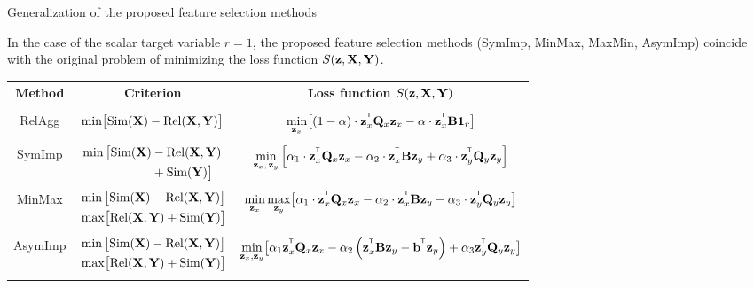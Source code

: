 \documentclass[10pt]{beamer}
\begin{document}
\begin{frame}{Generalization of the proposed feature selection methods}
	\begin{theorem}[Isachenko, 2018]
		In the case of the scalar target variable $r=1$, the proposed feature selection methods (SymImp, MinMax, MaxMin, AsymImp) coincide with the original problem of minimizing the loss function $S(\bz, \bX, \bY)$.
	\end{theorem}
	\begin{table}
		\centering
		\footnotesize{
			\begin{tabular}{c|c|c}
				\hline
				Method & Criterion & Loss function $S(\bz, \bX, \bY)$ \\
				\hline && \\ 
				RelAgg & $\min \bigl[ \text{Sim}(\bX) - \text{Rel}(\bX, \bY) \bigr] $ & $\min\limits_{\bz_x} \bigl[ (1 - \alpha) \cdot \bz_x^{\T} \bQ_x \bz_x - \alpha \cdot \bz_x^{\T} \bB \bOne_r \bigr] $ \\ &&\\
				SymImp & $\begin{aligned} \min \, \bigl[ \text{Sim}(\bX) & - \text{Rel}(\bX, \bY) \\ & + \text{Sim}(\bY) \bigr] \end{aligned}$ & $ \min\limits_{\bz_x, \, \bz_y} \left[ \alpha_1 \cdot \bz_x^{\T} \bQ_x \bz_x - \alpha_2 \cdot \bz_x^{\T} \bB \bz_y + \alpha_3 \cdot \bz_y^{\T} \bQ_y \bz_y \right] $\\ &&\\ 
				MinMax & $\begin{aligned} &\min \, \bigl[ \text{Sim}(\bX) - \text{Rel}(\bX, \bY) \bigr]  \\ & \max \bigl[\text{Rel}(\bX, \bY) + \text{Sim}(\bY) \bigr] \end{aligned}$ & $	\min\limits_{\bz_x} 	\max\limits_{\bz_y} \bigl[\alpha_1 \cdot \bz_x^{\T} \bQ_x \bz_x - \alpha_2 \cdot \bz_x^{\T} \bB \bz_y - \alpha_3 \cdot \bz_y^{\T} \bQ_y \bz_y \bigr]$ \\ &&\\ 
				AsymImp & $\begin{aligned} & \min \, \bigl[ \text{Sim}(\bX) - \text{Rel}(\bX, \bY) \bigr]\\ &  \max \bigl[\text{Rel}(\bX, \bY) + \text{Sim}(\bY) \bigr] \end{aligned}$ & $\min\limits_{\bz_x, \bz_y} \bigl[ \alpha_1 \bz_x^{\T} \bQ_x \bz_x - \alpha_2 \left(\bz_x^{\T} \bB \bz_y - \bb^{\T} \bz_y \right) + \alpha_3  \bz_y^{\T} \bQ_y \bz_y \bigr]$\\  && \\
				\hline
		\end{tabular}}
	\end{table}
\end{frame}
\end{document}
